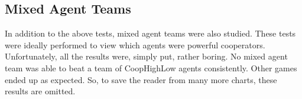 \subsection{Mixed Agent Teams}

In addition to the above tests, mixed agent teams were also studied. These tests were ideally performed to view which agents were powerful cooperators.
Unfortunately, all the results were, simply put, rather boring. No mixed agent team was able to beat a team of CoopHighLow agents consistently.
Other games ended up as expected. So, to save the reader from many more charts, these results are omitted.

